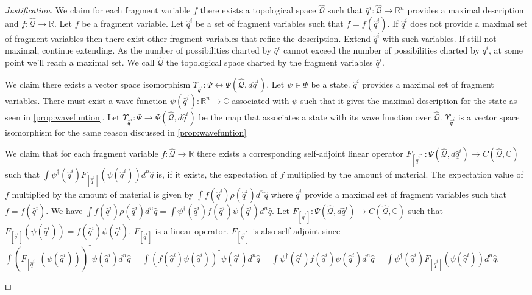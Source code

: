 \documentclass[smallextended]{svjour3}
\numberwithin{equation}{section}
\newenvironment{justification}{\emph{Justification}.}{\hfill\(\qed\)}
\theoremstyle{definition}
\newenvironment{justification}{\emph{Justification}.}{\qed}
\newcommand{\journal}[1]{\ifjournal#1\fi}
\begin{document}
\begin{justification}
	We claim for each fragment variable $f$ there exists a topological space $\hat{\mathcal{Q}}$ such that  $\hat{q}^i : \hat{\mathcal{Q}} \rightarrow \mathbb{R}^n$ provides a maximal description and $f : \hat{\mathcal{Q}} \rightarrow \mathbb{R}$. Let $f$ be a fragment variable. Let $\hat{q}^i$ be a set of fragment variables such that $f=f(\hat{q}^i)$. If $\hat{q}^i$ does not provide a maximal set of fragment variables then there exist other fragment variables that refine the description. Extend $\hat{q}^i$ with such variables. If still not maximal, continue extending. As the number of possibilities charted by $\hat{q}^i$ cannot exceed the number of possibilities charted by $q^i$, at some point we'll reach a maximal set. We call $\hat{\mathcal{Q}}$ the topological space charted by the fragment variables $\hat{q}^i$.
	
	We claim there exists a vector space isomorphism $\Upsilon_{\hat{\mathcal{q}}^i} : \Psi \leftrightarrow \Psi(\hat{\mathcal{Q}}, d\hat{q}^i)$. Let $\psi \in \Psi$ be a state. $\hat{q}^i$ provides a maximal set of fragment variables. There must exist a wave function $\psi(\hat{q}^i) : \mathbb{R}^n \rightarrow \mathbb{C}$ associated with $\psi$ such that it gives the maximal description for the state as seen in \ref{prop:wavefuntion}. Let $\Upsilon_{\hat{\mathcal{q}}^i} : \Psi \rightarrow \Psi(\hat{\mathcal{Q}}, d\hat{q}^i)$ be the map that associates a state with its wave function over $\hat{\mathcal{Q}}$. $\Upsilon_{\hat{\mathcal{q}}^i}$ is a vector space isomorphism for the same reason discussed in \ref{prop:wavefuntion}
	
	We claim that for each fragment variable $f : \hat{\mathcal{Q}} \rightarrow \mathbb{R}$ there exists a corresponding self-adjoint linear operator $F_{[\hat{q}^i]} : \Psi(\hat{\mathcal{Q}}, d\hat{q}^i) \rightarrow C(\hat{\mathcal{Q}}, \mathbb{C})$ such that $\int \psi^\dagger(\hat{q}^i) F_{[\hat{q}^i]}( \psi(\hat{q}^i)) d^n \hat{q}$ is, if it exists, the expectation of $f$ multiplied by the amount of material. The expectation value of $f$ multiplied by the amount of material is given by $\int f(\hat{q}^i) \rho(\hat{q}^i) d^n\hat{q}$ where $\hat{q}^i$ provide a maximal set of fragment variables such that $f=f(\hat{q}^i)$. We have $\int f(\hat{q}^i) \rho(\hat{q}^i) d^n\hat{q} = \int \psi^\dagger(\hat{q}^i) f(\hat{q}^i) \psi(\hat{q}^i) d^{n}\hat{q}$. Let $F_{[\hat{q}^i]} : \Psi(\hat{\mathcal{Q}}, d\hat{q}^i) \rightarrow C(\hat{\mathcal{Q}}, \mathbb{C})$ such that $F_{[\hat{q}^i]} (\psi(\hat{q}^i)) = f(\hat{q}^i) \psi(\hat{q}^i)$. $F_{[\hat{q}^i]}$ is a linear operator. $F_{[\hat{q}^i]}$ is also self-adjoint since\journal{\break} $\int (F_{[\hat{q}^i]}(\psi(\hat{q}^i)))^\dagger \psi(\hat{q}^i) d^{n}\hat{q} = \int (f(\hat{q}^i) \psi(\hat{q}^i))^\dagger \psi(\hat{q}^i) d^{n}\hat{q} = \int \psi^\dagger(\hat{q}^i) f(\hat{q}^i) \psi(\hat{q}^i) d^{n}\hat{q} = \int \psi^\dagger(\hat{q}^i) F_{[\hat{q}^i]} (\psi(\hat{q}^i)) d^{n}\hat{q}$.
		

\end{justification}
\end{document}
